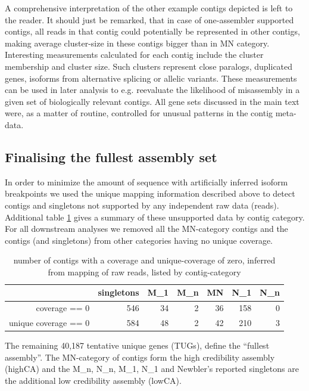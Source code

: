 \documentclass[12pt,a4paper]{article}
\begin{document}
A comprehensive interpretation of the other example contigs depicted
is left to the reader. It should just be remarked, that in case of
one-assembler supported contigs, all reads in that contig could
potentially be represented in other contigs, making average
cluster-size in these contigs bigger than in MN category.\\

Interesting measurements calculated for each contig include the
cluster membership and cluster size. Such clusters represent close
paralogs, duplicated genes, isoforms from alternative splicing or
allelic variants. These measurements can be used in later analysis to
e.g. reevaluate the likelihood of misassembly in a given set of
biologically relevant contigs. All gene sets discussed in the main
text were, as a matter of routine, controlled for unusual patterns in
the contig meta-data.

\subsection{Finalising the fullest assembly set}
\label{sec:final-full-assembly}

In order to minimize the amount of sequence with artificially inferred
isoform breakpoints we used the unique mapping information described
above to detect contigs and singletons not supported by any
independent raw data (reads). Additional table \ref{tab:cov.ex} gives
a summary of these unsupported data by contig category. For all
downstream analyses we removed all the MN-category contigs and the
contigs (and singletons) from other categories having no unique
coverage.

\begin{table}[ht]
\begin{center}
\begin{tabular}{rrrrrrr}
  \hline
 & singletons & M\_1 & M\_n & MN & N\_1 & N\_n \\ 
  \hline
coverage == 0 & 546 &  34 &   2 &  36 & 158 &   0 \\ 
  unique coverage == 0 & 584 &  48 &   2 &  42 & 210 &   3 \\ 
   \hline
\end{tabular}
\caption{number of contigs with a coverage and unique-coverage of zero, inferred from mapping of raw reads, listed by contig-category}
\label{tab:cov.ex}
\end{center}
\end{table}
The remaining 40,187 tentative unique genes (TUGs), define the
``fullest assembly''. The MN-category of contigs form the high
credibility assembly (highCA) and the M\_n, N\_n, M\_1, N\_1 and
Newbler's reported singletons are the additional low credibility
assembly (lowCA).
\end{document}
